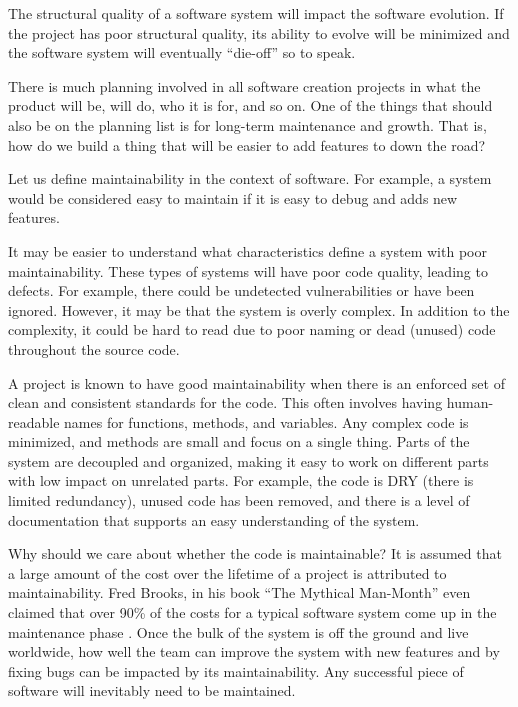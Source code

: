\documentclass[12pt,conference]{IEEEtran}
\begin{document}
The structural quality of a software system will impact the software evolution. If the project has poor structural quality, its ability to evolve will be minimized and the software system will eventually ``die-off'' so to speak.

There is much planning involved in all software creation projects in what the product will be, will do, who it is for, and so on. One of the things that should also be on the planning list is for long-term maintenance and growth. That is, how do we build a thing that will be easier to add features to down the road?

Let us define maintainability in the context of software. For example, a system would be considered easy to maintain if it is easy to debug and adds new features.

It may be easier to understand what characteristics define a system with poor maintainability. These types of systems will have poor code quality, leading to defects. For example, there could be undetected vulnerabilities or have been ignored. However, it may be that the system is overly complex. In addition to the complexity, it could be hard to read due to poor naming or dead (unused) code throughout the source code.

A project is known to have good maintainability when there is an enforced set of clean and consistent standards for the code. This often involves having human-readable names for functions, methods, and variables. Any complex code is minimized, and methods are small and focus on a single thing. Parts of the system are decoupled and organized, making it easy to work on different parts with low impact on unrelated parts. For example, the code is DRY (there is limited redundancy), unused code has been removed, and there is a level of documentation that supports an easy understanding of the system.

Why should we care about whether the code is maintainable? It is assumed that a large amount of the cost over the lifetime of a project is attributed to maintainability. Fred Brooks, in his book ``The Mythical Man-Month'' even claimed that over 90\% of the costs for a typical software system come up in the maintenance phase \cite{brooks:mythical}. Once the bulk of the system is off the ground and live worldwide, how well the team can improve the system with new features and by fixing bugs can be impacted by its maintainability. Any successful piece of software will inevitably need to be maintained.

\end{document}
